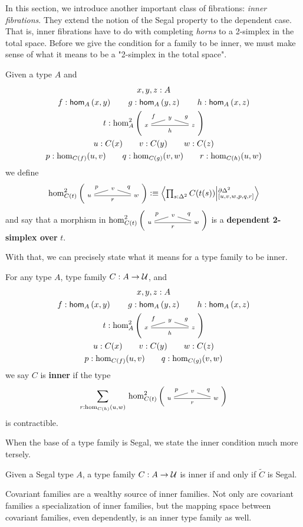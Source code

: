 \documentclass[main.tex]{subfiles}
\begin{document}
In this section, we introduce another important class of fibrations: \textit{inner fibrations}. They extend the notion of the Segal property to the dependent case. That is, 
inner fibrations have to do with completing \textit{horns} to a 2-simplex in the total space. Before we give the condition for a family
to be inner, we must make sense of what it means to be a "2-simplex in the total space".
\begin{definition}
    Given a type $A$ and
    \begin{gather*}
                          x,y,z : A  \\
    f : \ho[A]{x}{y} \qquad g : \ho[A]{y}{z} \qquad h:\ho[A]{x}{z} \\
    t : \homtwo{A}(x,y,z,f,g,h)\\
    u : C(x) \qquad v : C(y) \qquad w : C(z) \\
    p : \dho{C}{f}{u}{v} \qquad q : \dho{C}{g}{v}{w} \qquad r : \dho{C}{h}{u}{w}
    \end{gather*}
    we define
    $$\homtwo{C(t)}(u,v,w,p,q,r) \defeq \exten{s : \tsx}{C(t(s))}{\pardt}{[u,v,w,p,q,r]}$$
    and say that a morphism in $\homtwo{C(t)}(u,v,w,p,q,r)$ is a \textbf{dependent 2-simplex over} $t$.
\end{definition}
With that, we can precisely state what it means for a type family to be inner.

\begin{definition}
    For any type $A$, type family $C : A \to \mathcal{U}$, and
    \begin{gather*}
    x,y,z : A  \\
    f : \ho[A]{x}{y} \qquad g : \ho[A]{y}{z} \qquad h:\ho[A]{x}{z} \\
    t : \homtwo{A}(x,y,z,f,g,h)\\
    u : C(x) \qquad v : C(y) \qquad w : C(z) \\
    p : \dho{C}{f}{u}{v} \qquad q : \dho{C}{g}{v}{w}  
    \end{gather*}
    we say $C$ is \textbf{inner} if the type 
    \begin{equation}
        \sm{r : \dho{C}{h}{u}{w}}\homtwo{C(t)}(u,v,w,p,q,r)
    \end{equation}
    is contractible.
\end{definition}

When the base of a type family is Segal, we state the inner condition much more tersely.
\begin{lemma}
    \label{lem:totbaseseginner}
    Given a Segal type $A$, a type family $C : A \to \mathcal{U}$ is inner if and only if $\widetilde{C}$ is Segal.
\end{lemma}
Covariant families are a wealthy source of inner families. Not only are covariant families a specialization of inner families, but the mapping space between covariant families, even dependently, is an inner type family as well. 
\end{document}
